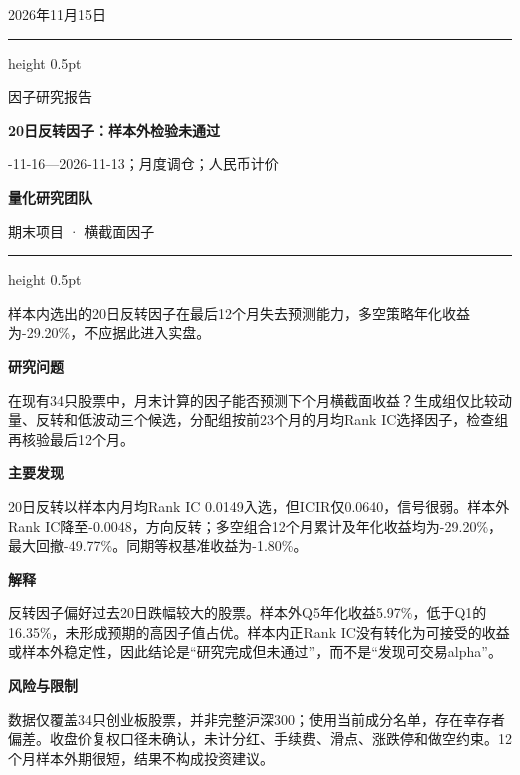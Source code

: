 \documentclass[a4paper,10pt]{article}
\newcommand{\ReportTitle}{20日反转因子：样本外检验未通过}
\newcommand{\ReportType}{因子研究报告}
\newcommand{\ReportDate}{2026年11月15日}
\newcommand{\ReportScope}{2023-11-16—2026-11-13；月度调仓；人民币计价}
\newcommand{\TeamName}{量化研究团队}
\newcommand{\DeskName}{期末项目 · 横截面因子}
\newcommand{\KeyFinding}{样本内选出的20日反转因子在最后12个月失去预测能力，多空策略年化收益为-29.20\%，不应据此进入实盘。}
\begin{document}
\begin{minipage}[t]{0.70\textwidth}
\vspace{0pt}
{\small\ReportDate}\par\medskip
{\color{MemoBlue}\hrule height 0.5pt}\smallskip
{\large\ReportType}\par
{\LARGE\bfseries\ReportTitle}\par\medskip
\ReportScope
\end{minipage}\hfill
\begin{minipage}[t]{0.23\textwidth}
\vspace{0pt}\raggedleft
\colorbox{MemoBlue}{\parbox[c][19mm][c]{0.86\linewidth}{\centering\color{white}\bfseries\TeamName}}\par\medskip
\DeskName
\end{minipage}
\par\bigskip
{\color{MemoBlue}\hrule height 0.5pt}\medskip
{\large\KeyFinding}\par\bigskip

\begin{minipage}[t]{0.61\textwidth}
\vspace{0pt}\raggedright
\setlength{\parskip}{4pt}
\textbf{研究问题}\par
在现有34只股票中，月末计算的因子能否预测下个月横截面收益？生成组仅比较动量、反转和低波动三个候选，分配组按前23个月的月均Rank IC选择因子，检查组再核验最后12个月。

\textbf{主要发现}\par
20日反转以样本内月均Rank IC 0.0149入选，但ICIR仅0.0640，信号很弱。样本外Rank IC降至-0.0048，方向反转；多空组合12个月累计及年化收益均为-29.20\%，最大回撤-49.77\%。同期等权基准收益为-1.80\%。

\textbf{解释}\par
反转因子偏好过去20日跌幅较大的股票。样本外Q5年化收益5.97\%，低于Q1的16.35\%，未形成预期的高因子值占优。样本内正Rank IC没有转化为可接受的收益或样本外稳定性，因此结论是“研究完成但未通过”，而不是“发现可交易alpha”。

\textbf{风险与限制}\par
数据仅覆盖34只创业板股票，并非完整沪深300；使用当前成分名单，存在幸存者偏差。收盘价复权口径未确认，未计分红、手续费、滑点、涨跌停和做空约束。12个月样本外期很短，结果不构成投资建议。
\end{minipage}\hfill
\begin{minipage}[t]{0.36\textwidth}
\vspace{0pt}\small

\medskip

\end{minipage}
\par\vfill
\end{document}
